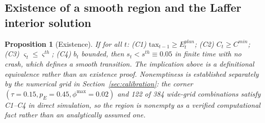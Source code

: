 \documentclass[review,12pt]{elsarticle}
\theoremstyle{plain}
\newtheorem{proposition}[theorem]{Proposition}
\theoremstyle{definition}
\theoremstyle{remark}
\begin{document}
\subsection{Existence of a smooth region and the Laffer interior solution}
\begin{proposition}[Existence]
\label{prop3a}
If for all $t$: (C1) $\text{tax}_{t-1}\ge E_t^{plan}$; (C2) $C_t\ge C^{min}$; (C3) $\varsigma_t\le\varsigma^{th}$; (C4) $b_t$ bounded, then $s_t<s^{th}\equiv0.05$ in finite time with no crash, which defines a smooth transition. The implication above is a definitional equivalence rather than an existence proof. Nonemptiness is established separately by the numerical grid in Section~\ref{sec:calibration}: the corner $(\tau=0.15,p_E=0.45,\phi^{\max}=0.02)$ and 122 of 384 wide-grid combinations satisfy C1--C4 in direct simulation, so the region is nonempty as a verified computational fact rather than an analytically assumed one.
\end{proposition}
\end{document}
